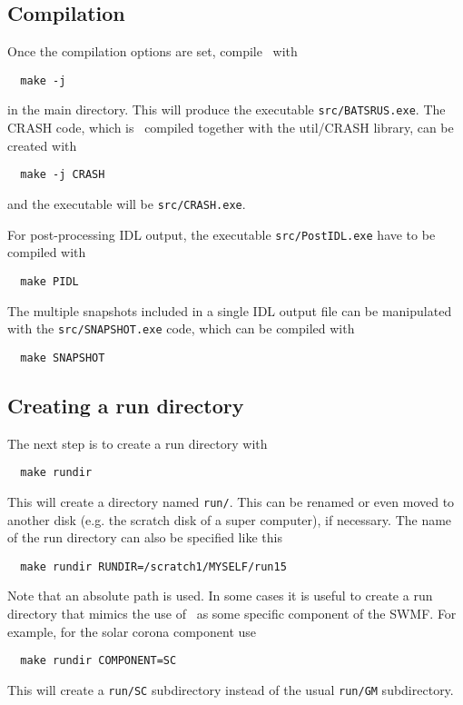 \subsection{Compilation}

Once the compilation options are set, compile \BATSRUS\ with
\begin{verbatim}
  make -j
\end{verbatim}
in the main directory. This will produce the executable 
{\tt src/BATSRUS.exe}. The CRASH code, which is \BATSRUS\
compiled together with the util/CRASH library, can be created with
\begin{verbatim}
  make -j CRASH
\end{verbatim}
and the executable will be {\tt src/CRASH.exe}. 

For post-processing IDL output, the executable {\tt src/PostIDL.exe}
have to be compiled with 
\begin{verbatim}
  make PIDL
\end{verbatim}
The multiple snapshots included in a single IDL output file can be 
manipulated with the {\tt src/SNAPSHOT.exe} code, 
which can be compiled with
\begin{verbatim}
  make SNAPSHOT
\end{verbatim}

\subsection{Creating a run directory}

The next step is to create a run directory with
\begin{verbatim}
  make rundir
\end{verbatim}
This will create a directory named {\tt run/}. This can be renamed
or even moved to another disk (e.g. the scratch disk of a super
computer), if necessary. The name of the run directory can also
be specified like this 
\begin{verbatim}
  make rundir RUNDIR=/scratch1/MYSELF/run15
\end{verbatim}
Note that an absolute path is used. 
In some cases it is useful to create a run directory that mimics
the use of \BATSRUS\ as some specific component of the SWMF. 
For example, for the solar corona component use
\begin{verbatim}
  make rundir COMPONENT=SC
\end{verbatim}
This will create a {\tt run/SC} subdirectory instead of the usual
{\tt run/GM} subdirectory.

